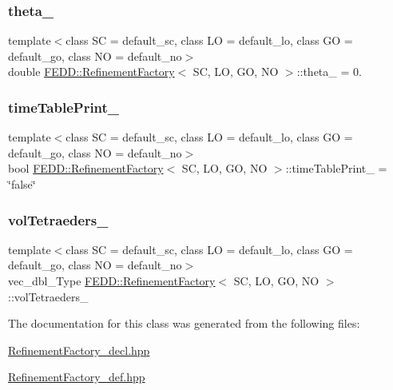 \subsubsection{\texorpdfstring{theta\+\_\+}{theta\_}}
{\footnotesize\ttfamily template$<$class SC = default\+\_\+sc, class LO = default\+\_\+lo, class GO = default\+\_\+go, class NO = default\+\_\+no$>$ \\
double \hyperlink{classFEDD_1_1RefinementFactory}{F\+E\+D\+D\+::\+Refinement\+Factory}$<$ SC, LO, GO, NO $>$\+::theta\+\_\+ = 0.}

\mbox{\label{classFEDD_1_1RefinementFactory_ad7ff86aebffde685089d462f2d04203e}} 
\subsubsection{\texorpdfstring{time\+Table\+Print\+\_\+}{timeTablePrint\_}}
{\footnotesize\ttfamily template$<$class SC = default\+\_\+sc, class LO = default\+\_\+lo, class GO = default\+\_\+go, class NO = default\+\_\+no$>$ \\
bool \hyperlink{classFEDD_1_1RefinementFactory}{F\+E\+D\+D\+::\+Refinement\+Factory}$<$ SC, LO, GO, NO $>$\+::time\+Table\+Print\+\_\+ = \char`\"{}false\char`\"{}}

\mbox{\label{classFEDD_1_1RefinementFactory_a7043a525164368b18359a399dede06c3}} 
\subsubsection{\texorpdfstring{vol\+Tetraeders\+\_\+}{volTetraeders\_}}
{\footnotesize\ttfamily template$<$class SC = default\+\_\+sc, class LO = default\+\_\+lo, class GO = default\+\_\+go, class NO = default\+\_\+no$>$ \\
vec\+\_\+dbl\+\_\+\+Type \hyperlink{classFEDD_1_1RefinementFactory}{F\+E\+D\+D\+::\+Refinement\+Factory}$<$ SC, LO, GO, NO $>$\+::vol\+Tetraeders\+\_\+\hspace{0.3cm}{\ttfamily [protected]}}



The documentation for this class was generated from the following files\+:\begin{DoxyCompactItemize}
\item 
\hyperlink{RefinementFactory__decl_8hpp}{Refinement\+Factory\+\_\+decl.\+hpp}\item 
\hyperlink{RefinementFactory__def_8hpp}{Refinement\+Factory\+\_\+def.\+hpp}\end{DoxyCompactItemize}
